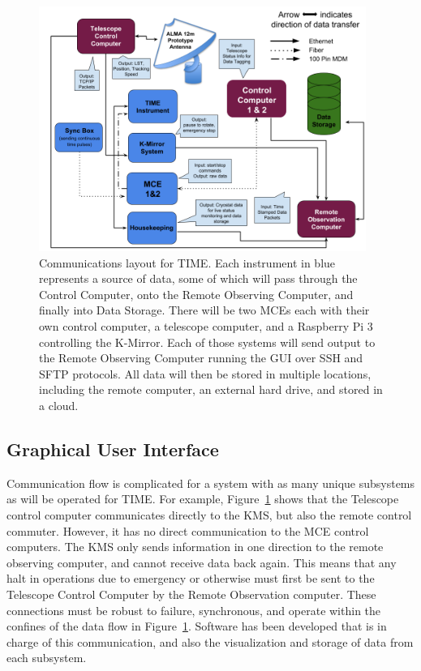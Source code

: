 \documentclass[manuscript]{aastex}
\begin{document}
\begin{figure}[H]
\centering
\captionsetup{width=0.95\textwidth}
\includegraphics[width=0.95\textwidth]{km9.png}
\caption[TIME Control Flow Diagram]{Communications layout for TIME. Each instrument in blue represents a source of data, some of which will pass through the Control Computer, onto the Remote Observing Computer, and finally into Data Storage. There will be two MCEs each with their own control computer, a telescope computer, and a Raspberry Pi 3 controlling the K-Mirror. Each of those systems will send output to the Remote Observing Computer running the GUI over SSH and SFTP protocols. All data will then be stored in multiple locations, including the remote computer, an external hard drive, and stored in a cloud.}
\label{fig:km9}
\end{figure}
\subsection{\textbf{Graphical User Interface}}
Communication flow is complicated for a system with as many unique subsystems as will be operated for TIME. For example, Figure~\ref{fig:km9} shows that the Telescope control computer communicates directly to the KMS, but also the remote control commuter. However, it has no direct communication to the MCE control computers. The KMS only sends information in one direction to the remote observing computer, and cannot receive data back again. This means that any halt in operations due to emergency or otherwise must first be sent to the Telescope Control Computer by the Remote Observation computer. These connections must be robust to failure, synchronous, and operate within the confines of the data flow in Figure~\ref{fig:km9}. Software has been developed that is in charge of this communication, and also the visualization and storage of data from each subsystem. 
\end{document}
